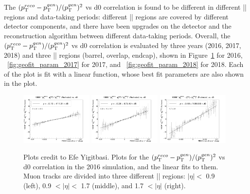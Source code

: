 The $(p_{\mathrm{T}}^{reco}-p_{\mathrm{T}}^{gen})/ (p_{\mathrm{T}}^{gen})^{2}$ vs d0 correlation is found to be different in different |\eta| regions and data-taking periods: 
different |\eta| regions are covered by different detector components, and there have been upgrades on the detector and the reconstruction algorithm between different data-taking periods.
Overall, the $(p_{\mathrm{T}}^{reco}-p_{\mathrm{T}}^{gen})/ (p_{\mathrm{T}}^{gen})^{2}$ vs d0 correlation is evaluated by three years (2016, 2017, 2018) and 
three |\eta| regions (barrel, overlap, endcap), shown in Figure~\ref{fig:geofit_param_2016} for 2016, ~\ref{fig:geofit_param_2017} for 2017, and ~\ref{fig:geofit_param_2018} for 2018.
Each of the plot is fit with a linear function, whose best fit parameters are also shown in the plot.

\begin{figure}[!htb]
      \centering
      \captionsetup{justification=justified}
      \includegraphics[width=0.32\textwidth]{pics/muon_corr/GeoFit/fit_results/2016_DY_eta_0_0p9_dRelPt2p0_Roch.png}
      \includegraphics[width=0.32\textwidth]{pics/muon_corr/GeoFit/fit_results/2016_DY_eta_0p9_1p7_dRelPt2p0_Roch.png}
      \includegraphics[width=0.32\textwidth]{pics/muon_corr/GeoFit/fit_results/2016_DY_eta_1p7_inf_dRelPt2p0_Roch.png}
      \caption{Plots credit to Efe Yigitbasi.
               Plots for the $(p_{\mathrm{T}}^{reco}-p_{\mathrm{T}}^{gen})/ (p_{\mathrm{T}}^{gen})^{2}$ vs d0 correlation in the 2016 \DY simulation, 
               and the linear fits to them. Muon tracks are divided into three different |\eta| regions:
               $|\eta| <$ 0.9 (left), 0.9 $< |\eta| <$ 1.7 (middle), and 1.7 $< |\eta|$ (right).
               }
      \label{fig:geofit_param_2016}
\end{figure}

